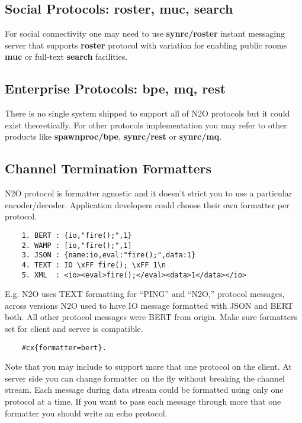 \subsection*{Social Protocols: {\bf roster}, {\bf muc}, {\bf search}}
For social connectivity one may need to use {\bf synrc/roster} instant messaging server
that supports {\bf roster} protocol  with variation
for enabling public rooms {\bf muc} or full-text {\bf search} facilities.

\subsection*{Enterprise Protocols: {\bf bpe}, {\bf mq}, {\bf rest}}
There is no single system shipped to support all of N2O protocols but it
could exist theoretically. For other protocols implementation you may refer
to other products like {\bf spawnproc/bpe}, {\bf synrc/rest} or {\bf synrc/mq}.

\newpage
\subsection*{Channel Termination Formatters}
N2O protocol is formatter agnostic and it doesn't strict you
to use a particular encoder/decoder.
Application developers could choose their own formatter per protocol.

\vspace{1\baselineskip}
\begin{lstlisting}
    1. BERT : {io,"fire();",1}
    2. WAMP : [io,"fire();",1]
    3. JSON : {name:io,eval:"fire();",data:1}
    4. TEXT : IO \xFF fire(); \xFF 1\n
    5. XML  : <io><eval>fire();</eval><data>1</data></io>
\end{lstlisting}
\vspace{1\baselineskip}

E.g. N2O uses TEXT formatting for ``PING'' and ``N2O,'' protocol messages,
across versions N2O used to have IO message formatted with JSON and BERT both.
All other protocol messages were BERT from origin.
Make sure formatters set for client and server is compatible.

\vspace{1\baselineskip}
\begin{lstlisting}
    #cx{formatter=bert}.
\end{lstlisting}
\vspace{1\baselineskip}

Note that you may include to support more that one protocol on the client.
At server side you can change formatter on the fly without breaking
the channel stream. Each message during data stream could be formatted
using only one protocol at a time. If you want to pass each message
through more that one formatter you should write an echo protocol.

